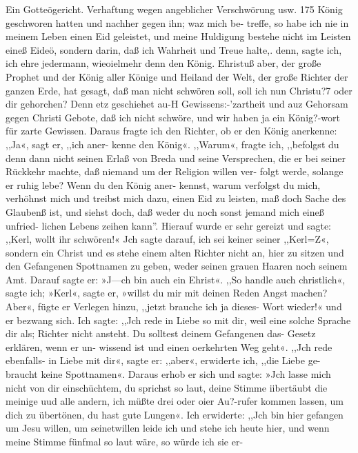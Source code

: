 Ein Gotteögericht. Verhaftung wegen angeblicher Verschwörung usw. 175
König geschworen hatten und nachher gegen ihn; waz mich be-
treffe, so habe ich nie in meinem Leben einen Eid geleistet, und
meine Huldigung bestehe nicht im Leisten eineß Eideö, sondern
darin, daß ich Wahrheit und Treue halte,. denn, sagte ich, ich
ehre jedermann, wieoielmehr denn den König. Ehristuß aber,
der große Prophet und der König aller Könige und Heiland der
Welt, der große Richter der ganzen Erde, hat gesagt, daß man
nicht schwören soll, soll ich nun Christu?7 oder dir gehorchen?
Denn etz geschiehet au-H Gewissens:-’zartheit und auz Gehorsam gegen
Christi Gebote, daß ich nicht schwöre, und wir haben ja ein
König?-wort für zarte Gewissen. Daraus fragte ich den
Richter, ob er den König anerkenne: ,,Ja«, sagt er, ,,ich aner-
kenne den König«. ,,Warum«, fragte ich, ,,befolgst du denn dann
nicht seinen Erlaß von Breda und seine Versprechen, die er bei
seiner Rückkehr machte, daß niemand um der Religion willen ver-
folgt werde, solange er ruhig lebe? Wenn du den König aner-
kennst, warum verfolgst du mich, verhöhnst mich und treibst mich
dazu, einen Eid zu leisten, maß doch Sache des Glaubenß ist, und
siehst doch, daß weder du noch sonst jemand mich eineß unfried-
lichen Lebens zeihen kann''. Hierauf wurde er sehr gereizt und
sagte: ,,Kerl, wollt ihr schwören!« Jch sagte darauf, ich sei keiner
seiner ,,Kerl=Z«, sondern ein Christ und es stehe einem alten Richter nicht
an, hier zu sitzen und den Gefangenen Spottnamen zu geben,
weder seinen grauen Haaren noch seinem Amt. Darauf sagte er:
»J—ch bin auch ein Ehrist«. ,,So handle auch christlich«, sagte ich;
»Kerl«, sagte er, »willst du mir mit deinen Reden Angst machen?
Aber«, fügte er Verlegen hinzu, ,,jetzt brauche ich ja dieses- Wort
wieder!« und er bezwang sich. Ich sagte: ,,Jch rede in Liebe so
mit dir, weil eine solche Sprache dir als; Richter nicht ansteht.
Du solltest deinem Gefangenen das- Gesetz erklären, wenn er un-
wissend ist und einen oerkehrten Weg geht«. ,,Jch rede ebenfalls-
in Liebe mit dir«, sagte er: ,,aber«, erwiderte ich, ,,die Liebe ge-
braucht keine Spottnamen«. Daraus erhob er sich und sagte: »Jch
lasse mich nicht von dir einschüchtem, du sprichst so laut, deine
Stimme iibertäubt die meinige uud alle andern, ich müßte drei
oder oier Au?-rufer kommen lassen, um dich zu übertönen, du hast
gute Lungen«. Ich erwiderte: ,,Jch bin hier gefangen um Jesu
willen, um seinetwillen leide ich und stehe ich heute hier, und
wenn meine Stimme fünfmal so laut wäre, so würde ich sie er-


